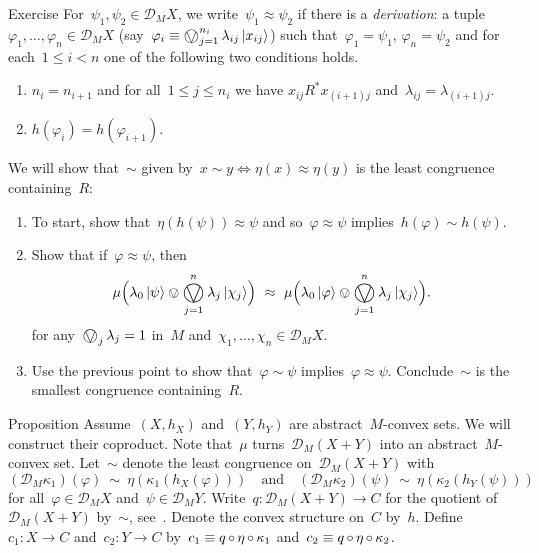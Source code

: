 \documentclass[b]{subfiles}
\begin{document}
\begin{parsec}
\begin{point}{Exercise}
For~$\psi_1,\psi_2 \in \mathcal{D}_M X$,
    we write~$\psi_1 \approx \psi_2$
    if there is a \emph{derivation}: a tuple~$\varphi_1, \ldots, \varphi_n \in \mathcal{D}_M X$
(say~$\varphi_i \equiv \bigovee^{n_i}_{j = 1}  \lambda_{ij}\ket{x_{ij}}$)
such that~$\varphi_1 = \psi_1$, $\varphi_n = \psi_2$ 
    and for each~$1 \leq i<n$ one of the following two conditions holds.
\begin{enumerate}
\item
    $n_i = n_{i+1}$
    and for all~$1 \leq j \leq n_i$ we have
    $x_{ij} \mathrel{R^*} x_{(i+1)j}$
    and~$\lambda_{ij}  = \lambda_{(i+1)j}$.
\item
    $h (\varphi_i) = h(\varphi_{i+1})$.
\end{enumerate}
We will show that~$\sim$
    given by~$x \sim y \iff \eta (x) \approx \eta(y)$
    is the least congruence containing~$R$:
\begin{enumerate}
\item
To start, show that~$\eta ( h(\psi)) \approx \psi $
    and so~$\varphi \approx \psi$ implies~$h(\varphi) \sim h(\psi)$.
\item
Show that if~$\varphi \approx \psi$,
    then
    \begin{equation*}
    \mu \Bigl(\lambda_0 \ket{\psi} \ovee \bigovee_{j=1}^n \lambda_j \ket{\chi_j}\Bigr)
    \ \approx  \ 
    \mu \Bigl(\lambda_0 \ket{\varphi} \ovee \bigovee_{j=1}^n \lambda_j \ket{\chi_j}\Bigr).
    \end{equation*}
    for any~$\bigovee_j \lambda_j=1$  in~$M$ and~$\chi_1,\ldots, \chi_n \in \mathcal{D}_M X$.
\item
    Use the previous point to show that~$\varphi \sim \psi$
        implies~$\varphi \approx \psi$.
Conclude~$\sim$ is the smallest congruence containing~$R$.
\end{enumerate}
\end{point}
\begin{point}[aconv-coprod]{Proposition}%
Assume~$(X,h_X)$ and~$(Y,h_Y)$
    are abstract~$M$-convex sets.
    We will construct their coproduct.
Note that~$\mu$ turns~$\mathcal{D}_M (X+Y)$
    into an abstract~$M$-convex set.
Let~$\sim$ denote the least congruence on~$\mathcal{D}_M (X+Y)$
with
\begin{equation}
    (\mathcal{D}_M \kappa_1) (\varphi)
    \ \sim \ \eta(\kappa_1 ( h_X (\varphi)))
    \quad \text{and} \quad
    (\mathcal{D}_M \kappa_2) (\psi)
    \ \sim \ \eta(\kappa_2 ( h_Y (\psi))) \label{congruence-coprod-conv}
\end{equation}
    for all~$\varphi \in \mathcal{D}_M X$
    and~$\psi \in \mathcal{D}_M Y$.
Write~$q\colon \mathcal{D}_M (X+Y) \to C$
    for the quotient of~$\mathcal{D}_M(X+Y)$ by~$\sim$, see~.
    Denote the convex structure on~$C$ by~$h$.
Define~$c_1 \colon X \to C$ and~$c_2 \colon Y \to C$
    by~$c_1 \equiv q \mathop{\circ} \eta \mathop{\circ} \kappa_1$
    and~$c_2 \equiv q \mathop{\circ} \eta \mathop{\circ} \kappa_2$.


\end{point}
\end{parsec}
\end{document}
